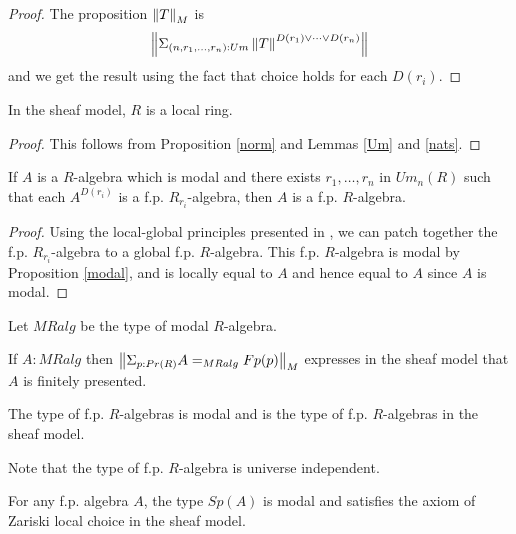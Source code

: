     \begin{proof}
      The proposition $\left\lVert T \right\rVert_M$ is
      $$\left\lVert \Sigma_{(n,r_1,\dots,r_n):Um}\left\lVert T \right\rVert^{D(r_1)\vee\dots\vee D(r_n)} \right\rVert$$
      and we get the result using the fact that choice holds for each $D(r_i)$.
    \end{proof}
    
    \begin{proposition}
      In the sheaf model, $R$ is a local ring.
    \end{proposition}

    \begin{proof}
      This follows from Proposition \ref{norm} and Lemmas \ref{Um} and \ref{nats}.
    \end{proof}

    \begin{lemma}
      If $A$ is a $R$-algebra which is modal and there exists $r_1,\dots,r_n$ in $Um_n(R)$ such that each
      $A^{D(r_i)}$ is a f.p. $R_{r_i}$-algebra, then $A$ is a f.p. $R$-algebra.
    \end{lemma}
    
    \begin{proof}
      Using the local-global principles presented in \cite{lombardi-quitte}, we can patch together the f.p. $R_{r_i}$-algebra
      to a global f.p. $R$-algebra. This f.p. $R$-algebra is modal by Proposition \ref{modal}, and is locally equal to $A$
      and hence equal to $A$ since $A$ is modal.
    \end{proof}

    Let $MRalg$ be the type of modal $R$-algebra.

    \begin{lemma}
      If $A:MRalg$ then $\left\lVert \Sigma_{p:Pr(R)}A =_{MRalg} Fp(p) \right\rVert_M$ expresses in the sheaf model that $A$ is finitely presented.
    \end{lemma}
    
    \begin{corollary}
      The type of f.p. $R$-algebras is modal and is the type of f.p. $R$-algebras in the sheaf model.
    \end{corollary}

     Note that the type of f.p. $R$-algebra is universe independent.

    \begin{proposition}
      For any f.p. algebra $A$, the type $Sp(A)$ is modal and satisfies the axiom of Zariski local choice in
      the sheaf model.
    \end{proposition}
    
